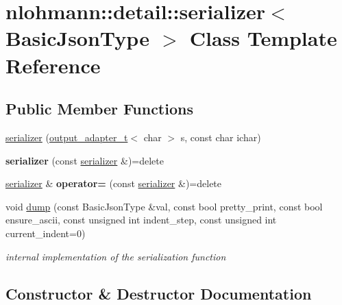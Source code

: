 \hypertarget{classnlohmann_1_1detail_1_1serializer}{}\section{nlohmann\+:\+:detail\+:\+:serializer$<$ Basic\+Json\+Type $>$ Class Template Reference}
\label{classnlohmann_1_1detail_1_1serializer}
\subsection*{Public Member Functions}
\begin{DoxyCompactItemize}
\item 
\hyperlink{classnlohmann_1_1detail_1_1serializer_a3076c4514179654cc81d17048439c24a}{serializer} (\hyperlink{namespacenlohmann_1_1detail_a0fd8edff7729aa2dd92b070964bade2e}{output\+\_\+adapter\+\_\+t}$<$ char $>$ s, const char ichar)
\item 
{\bfseries serializer} (const \hyperlink{classnlohmann_1_1detail_1_1serializer}{serializer} \&)=delete\hypertarget{classnlohmann_1_1detail_1_1serializer_ae3771351ec4cb892bec707edeb56dc31}{}\label{classnlohmann_1_1detail_1_1serializer_ae3771351ec4cb892bec707edeb56dc31}

\item 
\hyperlink{classnlohmann_1_1detail_1_1serializer}{serializer} \& {\bfseries operator=} (const \hyperlink{classnlohmann_1_1detail_1_1serializer}{serializer} \&)=delete\hypertarget{classnlohmann_1_1detail_1_1serializer_a5f14c33012477b9f9876dc54d97009a0}{}\label{classnlohmann_1_1detail_1_1serializer_a5f14c33012477b9f9876dc54d97009a0}

\item 
void \hyperlink{classnlohmann_1_1detail_1_1serializer_a95460ebd1a535a543e5a0ec52e00f48b}{dump} (const Basic\+Json\+Type \&val, const bool pretty\+\_\+print, const bool ensure\+\_\+ascii, const unsigned int indent\+\_\+step, const unsigned int current\+\_\+indent=0)
\begin{DoxyCompactList}\small\item\em internal implementation of the serialization function \end{DoxyCompactList}\end{DoxyCompactItemize}


\subsection{Constructor \& Destructor Documentation}
